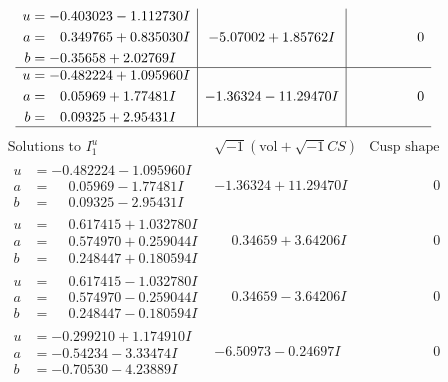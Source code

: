 \documentclass[1p]{elsarticle_modified}
\theoremstyle{definition}
\newcommand{\I}{\sqrt{-1}}
\begin{document}
$$\begin{array}{c|c|c}
\begin{aligned}
u &= -0.403023 - 1.112730 I \\
a &= \phantom{-}0.349765 + 0.835030 I \\
b &= -0.35658 + 2.02769 I\end{aligned}
 & -5.07002 + 1.85762 I & \phantom{-0.000000 } 0 \\ \hline\begin{aligned}
u &= -0.482224 + 1.095960 I \\
a &= \phantom{-}0.05969 + 1.77481 I \\
b &= \phantom{-}0.09325 + 2.95431 I\end{aligned}
 & -1.36324 - 11.29470 I & \phantom{-0.000000 } 0\\
 \hline 
 \end{array}$$\newpage$$\begin{array}{c|c|c}  
\text{Solutions to }I^u_{1}& \I (\text{vol} + \sqrt{-1}CS) & \text{Cusp shape}\\
 \hline 
\begin{aligned}
u &= -0.482224 - 1.095960 I \\
a &= \phantom{-}0.05969 - 1.77481 I \\
b &= \phantom{-}0.09325 - 2.95431 I\end{aligned}
 & -1.36324 + 11.29470 I & \phantom{-0.000000 } 0 \\ \hline\begin{aligned}
u &= \phantom{-}0.617415 + 1.032780 I \\
a &= \phantom{-}0.574970 + 0.259044 I \\
b &= \phantom{-}0.248447 + 0.180594 I\end{aligned}
 & \phantom{-}0.34659 + 3.64206 I & \phantom{-0.000000 } 0 \\ \hline\begin{aligned}
u &= \phantom{-}0.617415 - 1.032780 I \\
a &= \phantom{-}0.574970 - 0.259044 I \\
b &= \phantom{-}0.248447 - 0.180594 I\end{aligned}
 & \phantom{-}0.34659 - 3.64206 I & \phantom{-0.000000 } 0 \\ \hline\begin{aligned}
u &= -0.299210 + 1.174910 I \\
a &= -0.54234 - 3.33474 I \\
b &= -0.70530 - 4.23889 I\end{aligned}
 & -6.50973 - 0.24697 I & \phantom{-0.000000 } 0 \\ \hline\begin{aligned}

\end{aligned}
\end{array}$$
\end{document}

